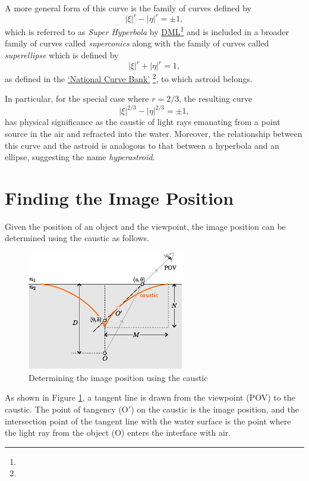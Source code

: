 \documentclass[twocolumn]{article}
\begin{document}
A more general form of this curve is the family of curves defined by
$$ \left| \xi \right|^{r} - \left| \eta \right|^{r} = \pm 1, $$
which is referred to as \emph{Super Hyperbola} by \href{http://dynamicmathematicslearning.com/super-ellipse.html}{DML}\footnote{} and is included in a broader family of curves called \emph{superconics} along with the family of curves called \emph{superellipse} which is defined by
$$ \left| \xi \right|^{r} + \left| \eta \right|^{r} = 1, $$ 
as defined in the  \href{https://old.nationalcurvebank.org/superconicncb/superconicncb.htm}{`National Curve Bank'}%
\footnote{}, to which astroid belongs.

In particular, for the special case where $r = 2/3$, the resulting curve
$$ \left| \xi \right|^{2/3} - \left| \eta \right|^{2/3} = \pm1, $$
has physical significance as the caustic of light rays emanating from a point source in the air and refracted into the water. Moreover, the relationship between this curve and the astroid is analogous to that between a hyperbola and an ellipse, suggesting the name \emph{hyperastroid}. 

\section{Finding the Image Position}

Given the position of an object and the viewpoint, the image position can be determined using the caustic as follows.

\begin{figure}[!h]
	\centering
	\includegraphics[width=2.7in]{figs/g394.eps}
	\caption{Determining the image position using the caustic}
	\label{fig:image_caustic}
\end{figure}

As shown in Figure \ref{fig:image_caustic}, a tangent line is drawn from the viewpoint (POV) to the caustic. The point of tangency ($\mathrm{O'}$) on the caustic is the image position, and the intersection point of the tangent line with the water surface is the point where the light ray from the object ($\mathrm{O}$) enters the interface with air.
\end{document}

